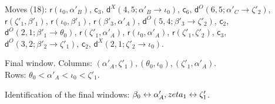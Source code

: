 \documentclass[11pt]{amsart}
\theoremstyle{definition}
\theoremstyle{remark}
\begin{document}
\noindent Moves (18): $\mathsf{r}(\iota_0,\alpha'_B)$, $\mathsf{c}_{3}$, $\mathsf{d}^{X}(4,5;\alpha'_B\to\iota_0)$, $\mathsf{c}_{6}$, $\mathsf{d}^{O}(6,5;\alpha'_C\to\zeta'_2)$, $\mathsf{r}(\zeta'_1,\beta'_1)$, $\mathsf{r}(\iota_0,\beta'_1)$, $\mathsf{r}(\beta'_3,\alpha'_A)$, $\mathsf{d}^{O}(5,4;\beta'_3\to\zeta'_2)$, $\mathsf{c}_{2}$, $\mathsf{d}^{O}(2,1;\beta'_1\to\theta_0)$, $\mathsf{r}(\zeta'_1,\alpha'_A)$, $\mathsf{r}(\iota_0,\alpha'_A)$, $\mathsf{r}(\zeta'_1,\zeta'_2)$, $\mathsf{c}_{3}$, $\mathsf{d}^{O}(3,2;\beta'_2\to\zeta'_1)$, $\mathsf{c}_{2}$, $\mathsf{d}^{X}(2,1;\zeta'_2\to\iota_0)$.\par
\noindent Final window. Columns: $(\alpha'_A,\zeta'_1),\allowbreak (\theta_0,\iota_0),\allowbreak (\zeta'_1,\alpha'_A)$.\\ Rows: $\theta_0 <\allowbreak \alpha'_A <\allowbreak \iota_0 <\allowbreak \zeta'_1$.\par\medskip
\noindent Identification of the final windows: $\beta_0\leftrightarrow \alpha'_A,\allowbreak \\zeta_1\leftrightarrow \zeta'_1$.\par\bigskip
\end{document}
